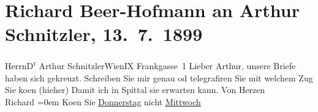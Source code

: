 

         \renewcommand{\erwaehnteOrte}{Orte: Frankgasse 1, IX., Alsergrund, Seeboden, Spittal an der Drau, Wien}
         \renewcommand{\erwaehnteWerke}{}
               \section[Richard Beer-Hofmann an Arthur Schnitzler, 13. 7. 1899]{ Richard Beer-Hofmann an Arthur Schnitzler, 13. 7. 1899}\nopagebreak{}\rehead{ }\begin{ledgroupsized}[t]{13cm}\normalsize\beginnumbering \toendnotes[C]{\smallbreak\pagebreak[2]} 
\pstart{}{\pb}Herrn\pend{}\pstart{}D\textsuperscript{r} Arthur Schnitzler\pend{}\pstart{}Wien\pend{}\pstart{}IX Frankgasse 1\pend{}{\bigskip}\pstart
           \noindent{}{\pb}Lieber Arthur, unsere Briefe haben sich gekreuzt. Schreiben Sie mir
               genau od telegrafiren Sie mit welchem Zug Sie ko{\geminationm}en
               (hieher) Damit ich in Spittal sie erwarten
               kann.\pend
           \pstart
           Von Herzen{\\[\baselineskip]}\spacefill\mbox{Richard}\pend
           \leftskip=0em{}\pstart
           \noindent{}Ko{\geminationm}en Sie \uline{Donnerstag}
                  nicht \uline{Mittwoch}\pend
           
         
         \endnumbering{}\end{ledgroupsized}  \newcommand{\dateiname}{L00940}\newcommand{\titel}{Richard Beer-Hofmann an Arthur Schnitzler, 13. 7. 1899}\newcommand{\editorInnen}{Martin Anton Müller und Gerd-Hermann Susen}
      